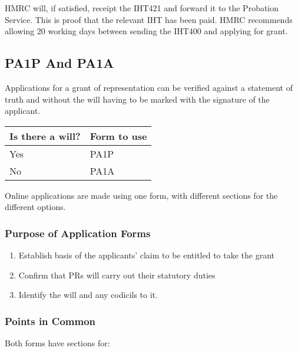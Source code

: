 \documentclass[
]{article}
\providecommand{\tightlist}{%
  \setlength{\itemsep}{0pt}\setlength{\parskip}{0pt}}
\begin{document}
HMRC will, if satisfied, receipt the IHT421 and forward it to the
Probation Service. This is proof that the relevant IHT has been paid.
HMRC recommends allowing 20 working days between sending the IHT400 and
applying for grant.

\hypertarget{pa1p-and-pa1a}{%
\subsection{PA1P And PA1A}\label{pa1p-and-pa1a}}

Applications for a grant of representation can be verified against a
statement of truth and without the will having to be marked with the
signature of the applicant.

\begin{longtable}[]{@{}ll@{}}
\toprule()
Is there a will? & Form to use \\
\midrule()
\endhead
Yes & PA1P \\
No & PA1A \\
\bottomrule()
\end{longtable}

Online applications are made using one form, with different sections for
the different options.

\hypertarget{purpose-of-application-forms}{%
\subsubsection{Purpose of Application
Forms}\label{purpose-of-application-forms}}

\begin{enumerate}
\def\labelenumi{\arabic{enumi}.}
\tightlist
\item
  Establish basis of the applicants' claim to be entitled to take the
  grant
\item
  Confirm that PRs will carry out their statutory duties
\item
  Identify the will and any codicils to it.
\end{enumerate}

\hypertarget{points-in-common}{%
\subsubsection{Points in Common}\label{points-in-common}}

Both forms have sections for:
\end{document}
